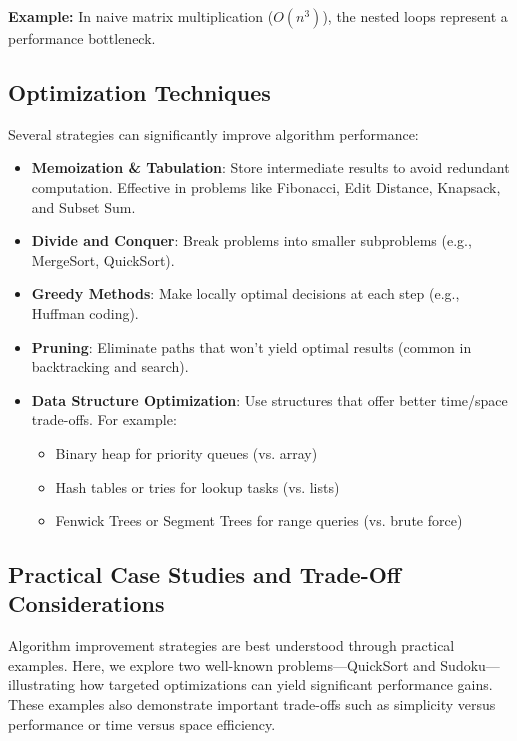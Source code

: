 \documentclass[12pt]{article}
\begin{document}
\textbf{Example:} In naive matrix multiplication (\(O(n^3)\)), the nested loops represent a performance bottleneck.

\subsection{Optimization Techniques}

Several strategies can significantly improve algorithm performance:
\begin{itemize}
    \item \textbf{Memoization \& Tabulation}: Store intermediate results to avoid redundant computation. Effective in problems like Fibonacci, Edit Distance, Knapsack, and Subset Sum.
    \item \textbf{Divide and Conquer}: Break problems into smaller subproblems (e.g., MergeSort, QuickSort).
    \item \textbf{Greedy Methods}: Make locally optimal decisions at each step (e.g., Huffman coding).
    \item \textbf{Pruning}: Eliminate paths that won't yield optimal results (common in backtracking and search).
    \item \textbf{Data Structure Optimization}: Use structures that offer better time/space trade-offs. For example:
    \begin{itemize}
        \item Binary heap for priority queues (vs. array)
        \item Hash tables or tries for lookup tasks (vs. lists)
        \item Fenwick Trees or Segment Trees for range queries (vs. brute force)
    \end{itemize}
\end{itemize}

\subsection{Practical Case Studies and Trade-Off Considerations}

Algorithm improvement strategies are best understood through practical examples. Here, we explore two well-known problems—QuickSort and Sudoku—illustrating how targeted optimizations can yield significant performance gains. These examples also demonstrate important trade-offs such as simplicity versus performance or time versus space efficiency.
\end{document}
